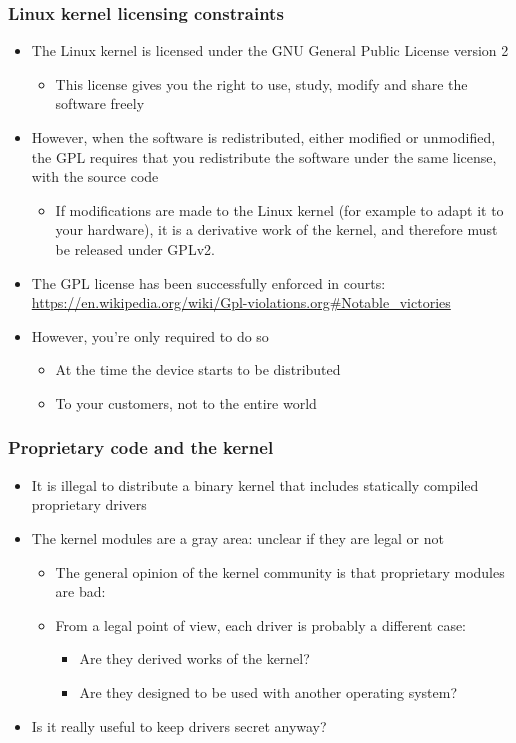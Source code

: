 \begin{frame}
  \frametitle{Linux kernel licensing constraints}
  \begin{itemize}
  \item The Linux kernel is licensed under the GNU General Public
    License version 2
    \begin{itemize}
    \item This license gives you the right to use, study, modify and
      share the software freely
    \end{itemize}
  \item However, when the software is redistributed, either modified
    or unmodified, the GPL requires that you redistribute the software
    under the same license, with the source code
    \begin{itemize}
    \item If modifications are made to the Linux kernel (for example
      to adapt it to your hardware), it is a derivative work of the
      kernel, and therefore must be released under GPLv2.
    \end{itemize}
  \item The GPL license has been successfully enforced in courts:
    \url{https://en.wikipedia.org/wiki/Gpl-violations.org\#Notable\_victories}
  \item However, you're only required to do so
    \begin{itemize}
    \item At the time the device starts to be distributed
    \item To your customers, not to the entire world
    \end{itemize}
  \end{itemize}
\end{frame}

\begin{frame}
  \frametitle{Proprietary code and the kernel}
  \begin{itemize}
  \item It is illegal to distribute a binary kernel that includes
    statically compiled proprietary drivers
  \item The kernel modules are a gray area: unclear if they are legal or not
    \begin{itemize}
    \item The general opinion of the kernel community is that
      proprietary modules are bad: 
    \item From a legal point of view, each driver is probably a
      different case:
      \begin{itemize}
      \item Are they derived works of the kernel?
      \item Are they designed to be used with another operating system?
      \end{itemize}
    \end{itemize}
  \item Is it really useful to keep drivers secret anyway?
  \end{itemize}
\end{frame}

